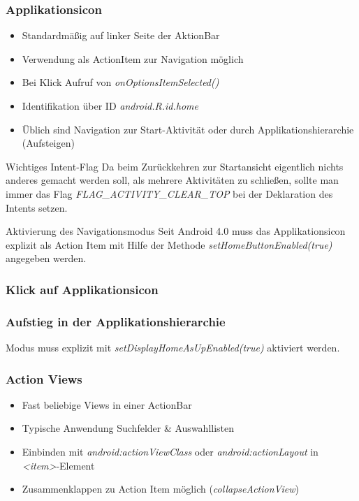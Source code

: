 \begin{frame}
   \frametitle{Applikationsicon}
   \begin{itemize}
      \item Standardmäßig auf linker Seite der AktionBar
      \item Verwendung als ActionItem zur Navigation möglich
      \item Bei Klick Aufruf von \emph{onOptionsItemSelected()}
      \item Identifikation über ID \emph{android.R.id.home}
      \item Üblich sind Navigation zur Start-Aktivität oder durch 
         Applikationshierarchie (Aufsteigen)
   \end{itemize}

   \begin{alertblock}{Wichtiges Intent-Flag}
      Da beim Zurückkehren zur Startansicht eigentlich nichts anderes gemacht werden soll, 
      als mehrere Aktivitäten zu schließen, sollte man immer das Flag 
      \emph{FLAG\_ACTIVITY\_CLEAR\_TOP} bei der Deklaration des Intents setzen.
   \end{alertblock}

   \begin{alertblock}{Aktivierung des Navigationsmodus}
      Seit Android 4.0 muss das Applikationsicon explizit als Action Item 
      mit Hilfe der Methode \emph{setHomeButtonEnabled(true)} angegeben werden.
   \end{alertblock}
\end{frame}

\begin{frame}
   \frametitle{Klick auf Applikationsicon}
   
\end{frame}

\begin{frame}
   \frametitle{Aufstieg in der Applikationshierarchie}
   Modus muss explizit mit \emph{setDisplayHomeAsUpEnabled(true)} aktiviert werden.

   
\end{frame}

\begin{frame}
   \frametitle{Action Views}
   \begin{itemize}
      \item Fast beliebige Views in einer ActionBar
      \item Typische Anwendung Suchfelder \& Auswahllisten
      \item Einbinden mit \emph{android:actionViewClass} 
         oder \emph{android:actionLayout} in \emph{\textless{}item\textgreater}-Element
      \item Zusammenklappen zu Action Item möglich (\emph{collapseActionView})
   \end{itemize}

   
\end{frame}

